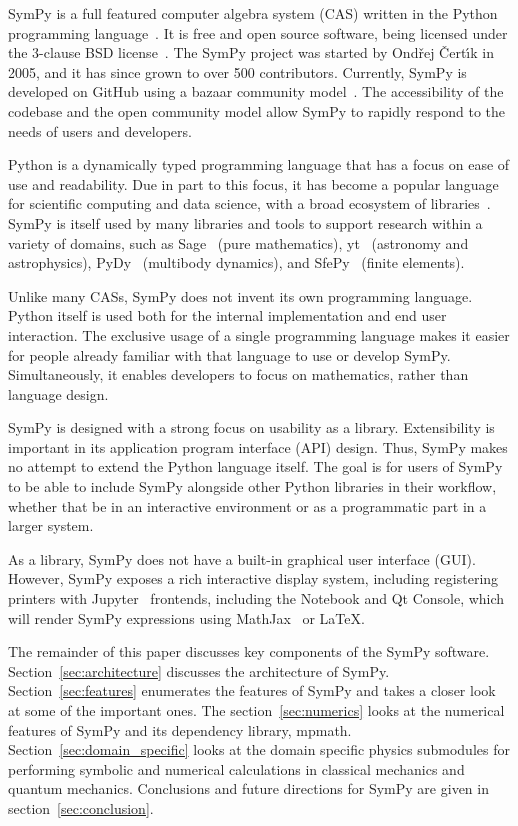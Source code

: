 SymPy is a full featured computer algebra system (CAS) written in the Python
programming language~\cite{lutz2013learning}.
It is free and open source software, being licensed under the 3-clause BSD
license~\cite{rosen2005open}.
The SymPy project was started by Ond\v{r}ej \v{C}ert\'{\i}k in 2005, and it has
since grown to over 500 contributors. Currently, SymPy is
developed on GitHub using a bazaar community
model~\cite{raymond1999cathedral}. The accessibility of the codebase and the
open community model allow SymPy to rapidly respond to the needs of
users and developers.

Python is a dynamically typed programming language that has a focus on
ease of use and readability. Due in part to this focus, it has become a popular
language for scientific
computing and data science, with a broad ecosystem of
libraries~\cite{oliphant2007python}. SymPy is itself used by many libraries
and tools to support research within a variety of domains, such as
Sage~\cite{SAGE} (pure mathematics),
yt~\cite{2011ApJS..192....9T} (astronomy and astrophysics),
PyDy~\cite{gede2013constrained} (multibody dynamics), and
SfePy~\cite{cimrman2014sfepy} (finite elements).

Unlike many CASs, SymPy does not invent its own programming language. Python
itself is used both for the internal implementation and end user
interaction. The exclusive usage of a single programming language makes it easier
for people already familiar with that language to use or develop SymPy.
Simultaneously, it enables developers to focus on mathematics, rather than
language design.

SymPy is designed with a strong focus on usability as a library.
Extensibility is important in its application program interface
(API) design. Thus, SymPy makes no attempt to extend
the Python language itself. The goal is for users of SymPy to be able to
include SymPy alongside other Python libraries in their workflow, whether that
be in an interactive environment or as a programmatic part in a larger system.


As a library, SymPy does not have a built-in graphical user
interface (GUI). However, SymPy exposes a rich interactive display system,
including registering printers with Jupyter~\cite{perez2007ipython} frontends,
including the Notebook and Qt Console, which will render SymPy
expressions using MathJax~\cite{cervone2012mathjax} or \LaTeX{}.

The remainder of this paper discusses key components of the SymPy software.
Section~\ref{sec:architecture} discusses the architecture of SymPy.
Section~\ref{sec:features} enumerates the features of SymPy and takes a closer
look at some of the important ones. The section~\ref{sec:numerics}
looks at the numerical features of SymPy and its dependency library, mpmath.
Section~\ref{sec:domain_specific} looks at the domain specific physics
submodules for performing symbolic and numerical calculations in classical mechanics
and quantum mechanics. Conclusions and future directions for SymPy are given
in section~\ref{sec:conclusion}.
